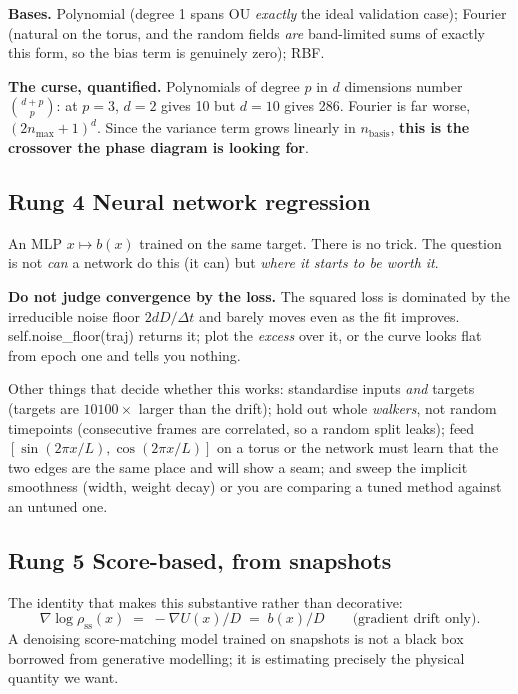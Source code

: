 \documentclass[11pt,a4paper]{article}
\newcommand{\code}[1]{{\ttfamily\small #1}}
\begin{document}
\textbf{Bases.} Polynomial (degree 1 spans OU \emph{exactly} \textemdash{} the ideal
validation case); Fourier (natural on the torus, and the random fields \emph{are}
band-limited sums of exactly this form, so the bias term is genuinely zero); RBF.

\textbf{The curse, quantified.} Polynomials of degree $p$ in $d$ dimensions number
$\binom{d+p}{p}$: at $p=3$, $d=2$ gives 10 but $d=10$ gives 286. Fourier is far worse,
$(2n_{\max}+1)^d$. Since the variance term grows linearly in $n_{\mathrm{basis}}$,
\textbf{this is the crossover the phase diagram is looking for}.

\subsection{Rung 4 \textemdash{} Neural network regression}

An MLP $x\mapsto b(x)$ trained on the same target. There is no trick. The question is
not \emph{can} a network do this (it can) but \emph{where it starts to be worth it}.

\begin{warnbox}
\textbf{Do not judge convergence by the loss.} The squared loss is dominated by the
irreducible noise floor $2dD/\Delta t$ and barely moves even as the fit improves.
\code{self.noise\_floor(traj)} returns it; plot the \emph{excess} over it, or the curve
looks flat from epoch one and tells you nothing.
\end{warnbox}

Other things that decide whether this works: standardise inputs \emph{and} targets
(targets are $10$\textendash$100\times$ larger than the drift); hold out whole
\emph{walkers}, not random timepoints (consecutive frames are correlated, so a random
split leaks); feed $[\sin(2\pi x/L), \cos(2\pi x/L)]$ on a torus or the network must
learn that the two edges are the same place and will show a seam; and sweep the implicit
smoothness (width, weight decay) or you are comparing a tuned method against an untuned
one.

\subsection{Rung 5 \textemdash{} Score-based, from snapshots}

The identity that makes this substantive rather than decorative:
\begin{equation}
  \nabla\log\rho_{\mathrm{ss}}(x) \;=\; -\nabla U(x)/D \;=\; b(x)/D
  \qquad\text{(gradient drift only).}
\end{equation}
A denoising score-matching model trained on snapshots is not a black box borrowed from
generative modelling; it is estimating precisely the physical quantity we want.
\end{document}
